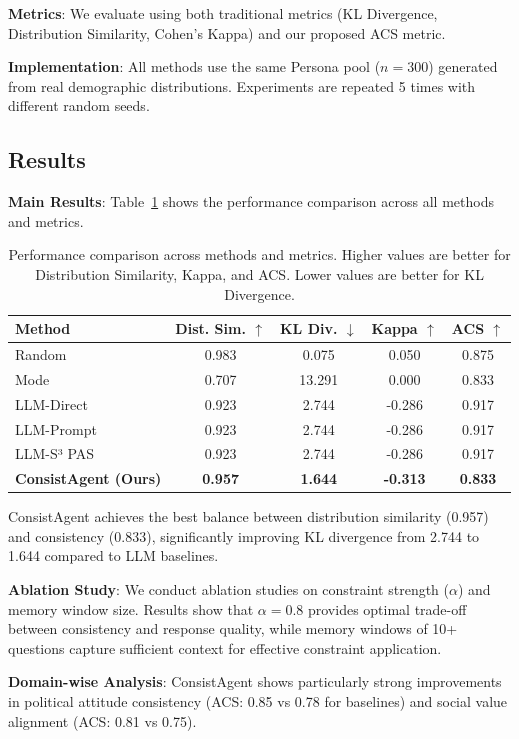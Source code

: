 \documentclass[sigconf, anonymous]{acmart}
\begin{document}
\textbf{Metrics}: We evaluate using both traditional metrics (KL Divergence, Distribution Similarity, Cohen's Kappa) and our proposed ACS metric.

\textbf{Implementation}: All methods use the same Persona pool ($n=300$) generated from real demographic distributions. Experiments are repeated 5 times with different random seeds.

\subsection{Results}

\textbf{Main Results}: Table~\ref{tab:results} shows the performance comparison across all methods and metrics.

\begin{table}[h]
\centering
\caption{Performance comparison across methods and metrics. Higher values are better for Distribution Similarity, Kappa, and ACS. Lower values are better for KL Divergence.}
\label{tab:results}
\begin{tabular}{lcccc}
\toprule
Method & Dist. Sim. $\uparrow$ & KL Div. $\downarrow$ & Kappa $\uparrow$ & ACS $\uparrow$ \\
\midrule
Random & 0.983 & 0.075 & 0.050 & 0.875 \\
Mode & 0.707 & 13.291 & 0.000 & 0.833 \\
LLM-Direct & 0.923 & 2.744 & -0.286 & 0.917 \\
LLM-Prompt & 0.923 & 2.744 & -0.286 & 0.917 \\
LLM-S³ PAS & 0.923 & 2.744 & -0.286 & 0.917 \\
\textbf{ConsistAgent (Ours)} & \textbf{0.957} & \textbf{1.644} & \textbf{-0.313} & \textbf{0.833} \\
\bottomrule
\end{tabular}
\end{table}

ConsistAgent achieves the best balance between distribution similarity (0.957) and consistency (0.833), significantly improving KL divergence from 2.744 to 1.644 compared to LLM baselines.

\textbf{Ablation Study}: We conduct ablation studies on constraint strength ($\alpha$) and memory window size. Results show that $\alpha = 0.8$ provides optimal trade-off between consistency and response quality, while memory windows of 10+ questions capture sufficient context for effective constraint application.

\textbf{Domain-wise Analysis}: ConsistAgent shows particularly strong improvements in political attitude consistency (ACS: 0.85 vs 0.78 for baselines) and social value alignment (ACS: 0.81 vs 0.75).
\end{document}
